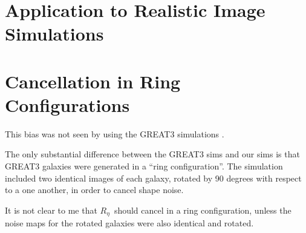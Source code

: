 \documentclass[usegraphicx,usenatbib]{mn2e}
\newcommand{\mcalRnoise}{$R_\eta$}
\begin{document}
\section{Application to Realistic Image Simulations}

\section{Cancellation in Ring Configurations}

This bias was not seen by \cite{HuffMcal} using the GREAT3 simulations
\citep{great3}.

The only substantial difference between the GREAT3 sims and our sims is that
GREAT3 galaxies were generated in a ``ring configuration''.  The simulation
included two identical images of each galaxy, rotated by 90 degrees with
respect to a one another, in order to cancel shape noise.

It is not clear to me that \mcalRnoise\ should cancel in a ring configuration,
unless the noise maps for the rotated galaxies were also identical and rotated.





\end{document}
